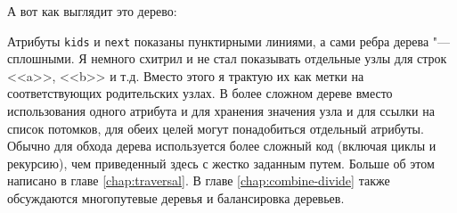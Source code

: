 А вот как выглядит это дерево:
\begin{figure}[!h]
\centering
{}
\end{figure}

Атрибуты \texttt{kids} и \texttt{next} показаны пунктирными линиями, а сами ребра дерева "--- сплошными. Я немного схитрил и не стал показывать отдельные узлы для строк <<a>>, <<b>> и т.д. Вместо этого я трактую их как метки на соответствующих родительских узлах. В более сложном дереве вместо использования одного атрибута и для хранения значения узла и для ссылки на список потомков, для обеих целей могут понадобиться отдельный атрибуты. Обычно для обхода дерева используется более сложный код (включая циклы и рекурсию), чем приведенный здесь с жестко заданным путем. Больше об этом написано в главе \ref{chap:traversal}. В главе \ref{chap:combine-divide} также обсуждаются многопутевые деревья и балансировка деревьев.

